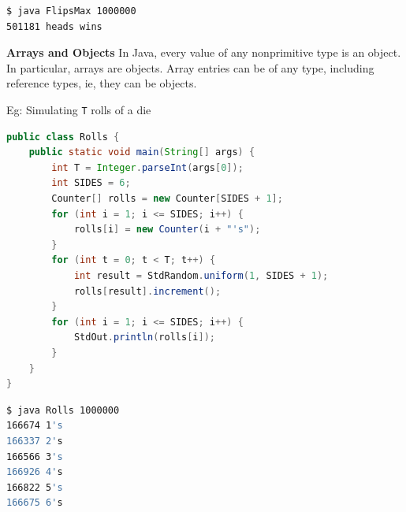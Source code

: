\documentclass[8pt,a4paper,compress]{beamer}
\begin{document}
\begin{frame}[fragile]
\pause

\begin{lstlisting}[language=bash]
$ java FlipsMax 1000000
501181 heads wins
\end{lstlisting}

\pause
\smallskip

\textbf{Arrays and Objects} In Java, every value of any nonprimitive type is an object. In particular, arrays are objects. Array entries can be of any type, including reference types, ie, they can be objects.

\pause
\smallskip

Eg: Simulating \lstinline$T$ rolls of a die

\begin{lstlisting}[language=Java]
public class Rolls {
    public static void main(String[] args) {
        int T = Integer.parseInt(args[0]);
        int SIDES = 6;
        Counter[] rolls = new Counter[SIDES + 1];
        for (int i = 1; i <= SIDES; i++) {
            rolls[i] = new Counter(i + "'s");
        }
        for (int t = 0; t < T; t++) {
            int result = StdRandom.uniform(1, SIDES + 1);
            rolls[result].increment();
        }
        for (int i = 1; i <= SIDES; i++) {
            StdOut.println(rolls[i]);
        }
    }
}
\end{lstlisting}

\pause

\begin{lstlisting}[language=bash]
$ java Rolls 1000000
166674 1's
166337 2's
166566 3's
166926 4's
166822 5's
166675 6's
\end{lstlisting}

\end{frame}
\end{document}
